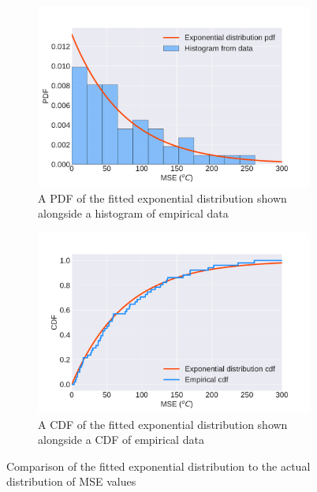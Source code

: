 \documentclass{article}
\begin{document}
\begin{figure}[htbp]
  \centering
  \begin{subfigure}[t]{.45\textwidth}
      \centering
      \includegraphics[width=\textwidth,keepaspectratio]{figures/misfit_pdf.pdf}
      \caption{A PDF of the fitted exponential distribution shown alongside a histogram of empirical data}
      \label{fig:misfit_pdf}
  \end{subfigure}
  \begin{subfigure}[t]{.45\textwidth}
      \centering
      \includegraphics[width=\textwidth ,keepaspectratio]{figures/misfit_cdf.pdf}
      \caption{A CDF of the fitted exponential distribution shown alongside a CDF of empirical data}
      \label{fig:misfit_cdf}
  \end{subfigure}
  \caption{Comparison of the fitted exponential distribution to the actual distribution of MSE values} 
  \label{fig:misfit_distribution}
\end{figure}
\end{document}
